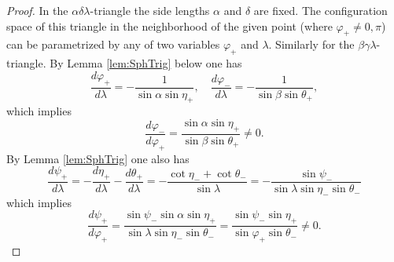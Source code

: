 \documentclass{amsart}
\theoremstyle{definition}
\renewcommand{\phi}{\varphi}
\begin{document}
\begin{proof}
In the $\alpha\delta\lambda$-triangle the side lengths $\alpha$ and $\delta$ are fixed.
The configuration space of this triangle in the neighborhood of the given point (where $\phi_+ \ne 0, \pi$) can be parametrized by any of two variables $\phi_+$ and $\lambda$.
Similarly for the $\beta\gamma\lambda$-triangle.
By Lemma \ref{lem:SphTrig} below one has
\[
\frac{d\phi_+}{d\lambda} = - \frac{1}{\sin\alpha\sin\eta_+}, \quad
\frac{d\phi_-}{d\lambda} = -\frac{1}{\sin\beta\sin\theta_+},
\]
which implies
\[
\frac{d\phi_-}{d\phi_+} = \frac{\sin\alpha\sin\eta_+}{\sin\beta\sin\theta_+} \ne 0.
\]
By Lemma \ref{lem:SphTrig} one also has
\[
\frac{d\psi_+}{d\lambda} = -\frac{d\eta_+}{d\lambda} - \frac{d\theta_+}{d\lambda}
= -\frac{\cot\eta_- + \cot\theta_-}{\sin\lambda}
= -\frac{\sin\psi_-}{\sin\lambda \sin\eta_- \sin\theta_-}
\]
which implies
\[
\frac{d\psi_+}{d\phi_+} = \frac{\sin\psi_- \sin\alpha \sin\eta_+}{\sin\lambda \sin\eta_- \sin\theta_-}
= \frac{\sin\psi_- \sin\eta_+}{\sin\phi_+ \sin\theta_-} \ne 0.
\]
\end{proof}
\end{document}
